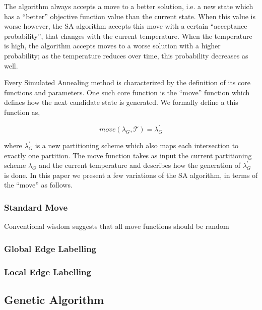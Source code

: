 The algorithm always accepts a move to a better solution, i.e. a new state which has a ``better'' objective function value than the current state. When this value is worse however, the SA algorithm accepts this move with a certain ``acceptance probability'', that changes with the current temperature. When the temperature is high, the algorithm accepts moves to a worse solution with a higher probability; as the temperature reduces over time, this probability decreases as well.

 Every Simulated Annealing method is characterized by the definition of its core functions and parameters. One such core function is the ``move'' function which defines how the next candidate state is generated. We formally define a this function as,

\begin{equation}
\label{eq:move-func}
move(\lambda_G, \mathcal{T}) =  \lambda_G^{'}
\end{equation}

\noindent where $\lambda_G^{'}$ is a new partitioning scheme which also maps each intersection to exactly one partition. The move function takes as input the current partitioning scheme $\lambda_G$ and the current temperature and describes how the generation of $\lambda_G^{'}$ is done. In this paper we present a few variations of the SA algorithm, in terms of the ``move'' as follows.

\subsubsection{Standard Move}
\label{sec:opti-std}
Conventional wisdom suggests that all move functions should be random 

\subsubsection{Global Edge Labelling}
\label{sec:opti-glob-edge}

\subsubsection{Local Edge Labelling}
\label{sec:opti-loca-edge}

\subsection{Genetic Algorithm}
\label{sec:gen-algo}

